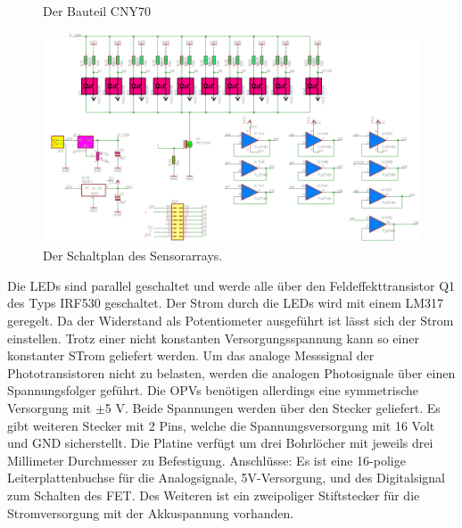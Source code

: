 \documentclass[a4paper,bibtotoc,oneside]{scrbook}
\begin{document}
\begin{figure}
\caption{Der Bauteil CNY70} \label{cny}
\end{figure} 

\begin{figure}[htbp]
\centering
\includegraphics[width=125mm]{img/array.png}
\caption{Der Schaltplan des Sensorarrays.}\label{array}
\end{figure}
Die LEDs sind parallel geschaltet und werde alle über den Feldeffekttransistor Q1 des Typs IRF530 geschaltet.
Der Strom durch die LEDs wird mit einem LM317 geregelt. Da der Widerstand als Potentiometer ausgeführt ist lässt sich der Strom einstellen. Trotz einer nicht konstanten Versorgungsspannung kann so einer konstanter STrom geliefert werden. Um das analoge Messsignal der Phototransistoren nicht zu belasten, werden die analogen Photosignale über einen Spannungsfolger geführt. Die OPVs benötigen allerdings eine symmetrische Versorgung mit $\pm$5 V. Beide Spannungen werden über den Stecker geliefert.
Es gibt weiteren Stecker mit 2 Pins, welche die Spannungsversorgung mit 16 Volt und GND sicherstellt. 
Die Platine verfügt um drei Bohrlöcher mit jeweils drei Millimeter Durchmesser zu Befestigung.
Anschlüsse: Es ist eine 16-polige Leiterplattenbuchse für die Analogsignale, 5V-Versorgung, und des Digitalsignal zum Schalten des FET. Des Weiteren ist ein zweipoliger Stiftstecker für die Stromversorgung mit der Akkuspannung vorhanden.
\end{document}
